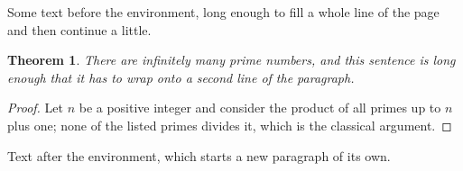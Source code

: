 \documentclass[twocolumn]{article}
\newtheorem{theorem}{Theorem}
\begin{document}
Some text before the environment, long enough to fill a whole line of the page and then continue a little.
\begin{theorem}
There are infinitely many prime numbers, and this sentence is long enough that it has to wrap onto a second line of the paragraph.
\end{theorem}
\begin{proof}
Let $n$ be a positive integer and consider the product of all primes up to $n$ plus one; none of the listed primes divides it, which is the classical argument.
\end{proof}
Text after the environment, which starts a new paragraph of its own.
\end{document}
